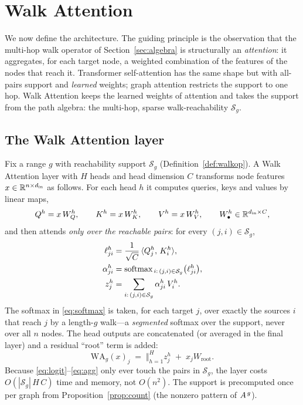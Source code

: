 \section{Walk Attention}\label{sec:model}

We now define the architecture. The guiding principle is the observation that the
multi-hop walk operator of Section~\ref{sec:algebra} is structurally an
\emph{attention}: it aggregates, for each target node, a weighted combination of
the features of the nodes that reach it. Transformer self-attention
\cite{vaswani2017attention} has the same shape but with all-pairs support and
\emph{learned} weights; graph attention \cite{velickovic2017graph} restricts the
support to one hop. Walk Attention keeps the learned weights of attention and
takes the support from the path algebra: the multi-hop, sparse walk-reachability
$\mathcal{S}_g$.

\subsection{The Walk Attention layer}

Fix a range $g$ with reachability support $\mathcal{S}_g$
(Definition~\ref{def:walkop}). A Walk Attention layer with $H$ heads and head
dimension $C$ transforms node features $x\in\mathbb{R}^{n\times d_{\text{in}}}$ as
follows. For each head $h$ it computes queries, keys and values by linear maps,
\[
  Q^h = x\,W^h_Q,\qquad K^h = x\,W^h_K,\qquad V^h = x\,W^h_V,
  \qquad W^h_\bullet\in\mathbb{R}^{d_{\text{in}}\times C},
\]
and then attends \emph{only over the reachable pairs}: for every
$(j,i)\in\mathcal{S}_g$,
\begin{align}
  \ell^h_{ji} &= \frac{1}{\sqrt{C}}\,\langle Q^h_j,\,K^h_i\rangle, \label{eq:logit}\\
  \alpha^h_{ji} &= \operatorname{softmax}_{\,i:\,(j,i)\in\mathcal{S}_g}\bigl(\ell^h_{ji}\bigr),
    \label{eq:softmax}\\
  z^h_j &= \sum_{i:\,(j,i)\in\mathcal{S}_g}\alpha^h_{ji}\,V^h_i. \label{eq:agg}
\end{align}
The softmax in \eqref{eq:softmax} is taken, for each target $j$, over exactly the
sources $i$ that reach $j$ by a length-$g$ walk---a \emph{segmented} softmax over
the support, never over all $n$ nodes. The head outputs are concatenated (or
averaged in the final layer) and a residual ``root'' term is added:
\[
  \mathrm{WA}_g(x)_j \;=\; \bigl\Vert_{h=1}^{H} z^h_j \;+\; x_j W_{\!\text{root}}.
\]
Because \eqref{eq:logit}--\eqref{eq:agg} only ever touch the pairs in
$\mathcal{S}_g$, the layer costs $O(|\mathcal{S}_g|\,H\,C)$ time and memory, not
$O(n^2)$. The support is precomputed once per graph from
Proposition~\ref{prop:count} (the nonzero pattern of $A^{\,g}$).

